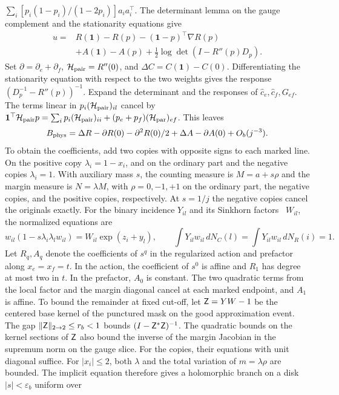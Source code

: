 \(\sum_i[p_i(1-p_i)/(1-2p_i)]a_i a_i^\top\). The determinant lemma on the gauge complement and the
stationarity equations give \begin{align*}
 u={}&R(\mathbf1)-R(p)-(\mathbf1-p)^\top\nabla R(p)\\
     &+A(\mathbf1)-A(p)+\tfrac12\log\det(I-R''(p)D_p).
\end{align*} Set \(\partial=\partial_e+\partial_f\), \(\mathcal H_{\rm pair}=R''(0)\), and \(\Delta
C=C(\mathbf1)-C(0)\). Differentiating the stationarity equation with respect to the two weights gives the
response \((D_p^{-1}-R''(p))^{-1}\). Expand the determinant and the responses of
\(\hat c_e,\hat c_f,G_{ef}\). The terms linear in \(p_i (\mathcal H_{\rm pair})_{il}\) cancel by
\(\mathbf1^\top \mathcal H_{\rm pair}p=\sum_i p_i(\mathcal H_{\rm pair})_{ii}+(p_e+p_f)(\mathcal H_{\rm
 par})_{ef}\). This leaves \[
 B_{\rm phys}=\Delta R-\partial R(0)-\partial^2 R(0)/2+\Delta A-\partial A(0)+O_b(j^{-3}).
\] To obtain the coefficients, add two copies with opposite signs to each marked line. On the positive
copy \(\lambda_i=1-x_i\), and on the ordinary part and the negative copies \(\lambda_i=1\). With
auxiliary mass \(s\), the counting measure is \(M=a+s\rho\) and the margin measure is \(N=\lambda M\),
with \(\rho=0,-1,+1\) on the ordinary part, the negative copies, and the positive copies, respectively.
At \(s=1/j\) the negative copies cancel the originals exactly. For the binary incidence \(Y_{il}\) and
its Sinkhorn factors~\cite{sk} \(W_{il}\), the normalized equations are \[
 w_{il}(1-s\lambda_i\lambda_l w_{il})=W_{il}\exp(z_i+y_l),\qquad
 \int Y_{il}w_{il}\,dN_C(l)=\int Y_{il}w_{il}\,dN_R(i)=1 .
\] Let \(R_q,A_q\) denote the coefficients of \(s^q\) in the regularized action and prefactor along
\(x_e=x_f=t\). In the action, the coefficient of \(s^0\) is affine and \(R_1\) has degree at most two in
\(t\). In the prefactor, \(A_0\) is constant. The two quadratic terms from the local factor and the
margin diagonal cancel at each marked endpoint, and \(A_1\) is affine. To bound the remainder at fixed
cut-off, let \(\mathsf Z=YW-1\) be the centered base kernel of the punctured mask on the good
approximation event. The gap \(\|\mathsf Z\|_{2\to2}\le r_b<1\) bounds \((I-\mathsf Z^*\mathsf Z)^{-1}\).
The quadratic bounds on the kernel sections of \(\mathsf Z\) also bound the inverse of the margin
Jacobian in the supremum norm on the gauge slice. For the copies, their equations with unit diagonal
suffice. For \(|x_i|\le2\), both \(\lambda\) and the total variation of \(m=\lambda\rho\) are bounded.
The implicit equation therefore gives a holomorphic branch on a disk \(|s|<\varepsilon_b\) uniform over
